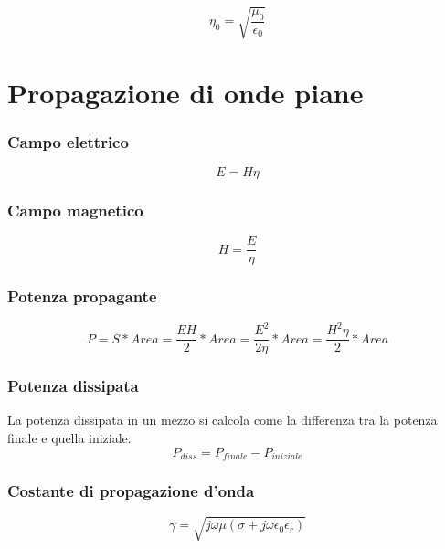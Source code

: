 \documentclass[10pt,a4paper]{report}
\begin{document}
		\begin{equation}
		\eta_0 = \sqrt{\frac{\mu_0}{\epsilon_0}} 
		\end{equation}
\chapter{Propagazione di onde piane}

	\subsection{Campo elettrico}

		\begin{equation}
		E=H\eta
		\label{eq:campo-elettrico}
		\end{equation}
		

	\subsection{Campo magnetico}
		\begin{equation}
		H=\frac{E}{\eta}
		\label{eq:campo-magnetico}
		\end{equation}
	

	\subsection{Potenza propagante}


		\begin{equation}
		P=S*Area=\frac{EH}{2}*Area=\frac{E^2}{2\eta}*Area=\frac{H^2\eta}{2}*Area
		\label{eq:potenza-propagante}
		\end{equation}
	
	\subsection{Potenza dissipata}

		La potenza dissipata in un mezzo si calcola come la differenza tra la potenza finale e quella iniziale.
		\begin{equation}
			P_{diss}=P_{finale}-P_{iniziale}
			\label{eq:potenza-dissipata}
		\end{equation}
	
	\subsection{Costante di propagazione d'onda}
		\begin{equation}
		\gamma=\sqrt{j\omega\mu(\sigma+j\omega\epsilon_0\epsilon_r)}
		\end{equation}
\end{document}
